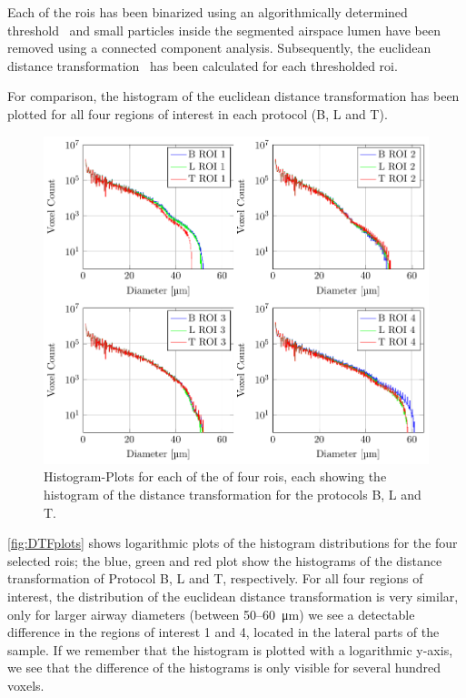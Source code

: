 Each of the \acp{roi} has been binarized using an algorithmically determined threshold~\cite{Otsu1979} and small particles inside the segmented airspace lumen have been removed using a connected component analysis. Subsequently, the euclidean distance transformation~\cite{Danielsson1980} has been calculated for each thresholded \ac{roi}.

For comparison, the histogram of the euclidean distance transformation has been plotted for all four regions of interest in each protocol (B, L and T).

\begin{figure}
	\centering
	\includegraphics[width=\linewidth]{img/Haberthuer2010/Fig09-DTF}
	\caption[Histogram-Plots]{Histogram-Plots for each of the of four \acp{roi}, each showing the histogram of the distance transformation for the protocols B, L and T.}%
	\label{fig:DTFplots}
\end{figure}

\autoref{fig:DTFplots} shows logarithmic plots of the histogram distributions for the four selected \acp{roi}; the blue, green and red plot show the histograms of the distance transformation of Protocol B, L and T, respectively. For all four regions of interest, the distribution of the euclidean distance transformation is very similar, only for larger airway diameters (between 50--\SI{60}{\micro\meter}) we see a detectable difference in the regions of interest 1 and 4, located in the lateral parts of the sample. If we remember that the histogram is plotted with a logarithmic y-axis, we see that the difference of the histograms is only visible for several hundred voxels.

